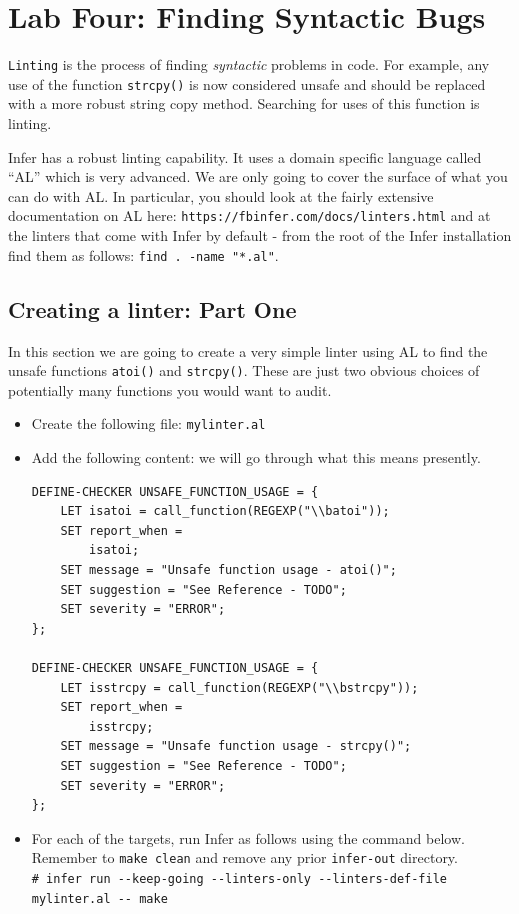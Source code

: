 \section{Lab Four: Finding Syntactic Bugs}

\texttt{Linting} is the process of finding \textit{syntactic} problems in code.
For example, any use of the function \verb|strcpy()| is now considered unsafe
and should be replaced with a more robust string copy method. 
Searching for uses of this function is linting.

Infer has a robust linting capability. It uses a domain specific language
called ``AL'' which is very advanced. We are only going to cover the surface 
of what you can do with AL. In particular, you should look at the fairly
extensive documentation on AL here: \verb|https://fbinfer.com/docs/linters.html|
and at the linters that come with Infer by default - from the root of the Infer installation  
find them as follows:  \verb|find . -name "*.al"|.

\subsection{Creating a linter: Part One}

In this section we are going to create a very simple linter using AL 
to find the unsafe functions \verb|atoi()| and \verb|strcpy()|. 
These are just two obvious choices of potentially many functions you would want to audit.

\begin{itemize}
	\item Create the following file: \verb|mylinter.al|
	\item Add the following content: we will go through what this means presently.
	\begin{verbatim}
DEFINE-CHECKER UNSAFE_FUNCTION_USAGE = {
	LET isatoi = call_function(REGEXP("\\batoi"));
	SET report_when =
		isatoi;
	SET message = "Unsafe function usage - atoi()";
	SET suggestion = "See Reference - TODO";
	SET severity = "ERROR";
};

DEFINE-CHECKER UNSAFE_FUNCTION_USAGE = {
	LET isstrcpy = call_function(REGEXP("\\bstrcpy"));
	SET report_when =
		isstrcpy;
	SET message = "Unsafe function usage - strcpy()";
	SET suggestion = "See Reference - TODO";
	SET severity = "ERROR";
};
	\end{verbatim}
	\item For each of the targets, run Infer as follows using the command below.\\
	Remember to \verb|make clean| and remove any prior \verb|infer-out| directory.\\
	\verb|# infer run --keep-going --linters-only --linters-def-file mylinter.al -- make|
\end{itemize}

